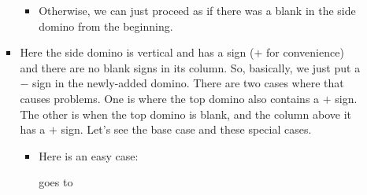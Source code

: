 \documentclass[12pt]{article}
\numberwithin{equation}{section}
\begin{document}
\begin{itemize}
\begin{itemize}
\begin{itemize}
\begin{itemize}
          \item Otherwise, we can just proceed as if there was a blank in the side domino from the beginning.
        \end{itemize}

        \item Here the side domino is vertical and has a sign ($+$ for convenience) and there are no blank signs in its column.
        So, basically, we just put a $-$ sign in the newly-added domino.
        There are two cases where that causes problems.
        One is where the top domino also contains a $+$ sign.
        The other is when the top domino is blank, and the column above it has a $+$ sign.
        Let's see the base case and these special cases.
        \begin{itemize}
          \item Here is an easy case:
          \begin{figure}[H]
            \centering
          \end{figure}
          goes to
          \begin{figure}[H]
            \centering

\end{figure}
\end{itemize}
\end{itemize}
\end{itemize}
\end{itemize}
\end{document}
